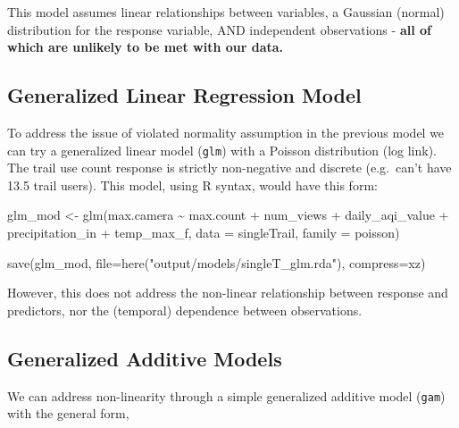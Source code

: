 \documentclass[
]{book}
\newenvironment{Shaded}{\begin{snugshade}}{\end{snugshade}}
\newcommand{\AttributeTok}[1]{\textcolor[rgb]{0.77,0.63,0.00}{#1}}
\newcommand{\FunctionTok}[1]{\textcolor[rgb]{0.00,0.00,0.00}{#1}}
\newcommand{\NormalTok}[1]{#1}
\newcommand{\OtherTok}[1]{\textcolor[rgb]{0.56,0.35,0.01}{#1}}
\newcommand{\SpecialCharTok}[1]{\textcolor[rgb]{0.00,0.00,0.00}{#1}}
\newcommand{\StringTok}[1]{\textcolor[rgb]{0.31,0.60,0.02}{#1}}
\begin{document}
This model assumes linear relationships between variables, a Gaussian (normal) distribution for the response variable, AND independent observations - \textbf{all of which are unlikely to be met with our data.}

\hypertarget{generalized-linear-regression-model-1}{%
\subsection{Generalized Linear Regression Model}\label{generalized-linear-regression-model-1}}

To address the issue of violated normality assumption in the previous model we can try a generalized linear model (\texttt{glm}) with a Poisson distribution (log link). The trail use count response is strictly non-negative and discrete (e.g.~can't have 13.5 trail users). This model, using R syntax, would have this form:

\begin{Shaded}
\begin{Highlighting}[]
\NormalTok{glm\_mod }\OtherTok{\textless{}{-}} \FunctionTok{glm}\NormalTok{(max.camera }\SpecialCharTok{\textasciitilde{}} 
\NormalTok{                 max.count }\SpecialCharTok{+} 
\NormalTok{                 num\_views }\SpecialCharTok{+}
\NormalTok{                 daily\_aqi\_value }\SpecialCharTok{+} 
\NormalTok{                 precipitation\_in }\SpecialCharTok{+} 
\NormalTok{                 temp\_max\_f, }
               \AttributeTok{data =}\NormalTok{ singleTrail, }
               \AttributeTok{family =}\NormalTok{ poisson)}

\FunctionTok{save}\NormalTok{(glm\_mod, }
     \AttributeTok{file=}\FunctionTok{here}\NormalTok{(}\StringTok{"output/models/singleT\_glm.rda"}\NormalTok{), }
     \AttributeTok{compress=}\StringTok{\textquotesingle{}xz\textquotesingle{}}\NormalTok{)}
\end{Highlighting}
\end{Shaded}

However, this does not address the non-linear relationship between response and predictors, nor the (temporal) dependence between observations.

\hypertarget{generalized-additive-models}{%
\subsection{Generalized Additive Models}\label{generalized-additive-models}}

We can address non-linearity through a simple generalized additive model (\texttt{gam}) with the general form,
\end{document}
